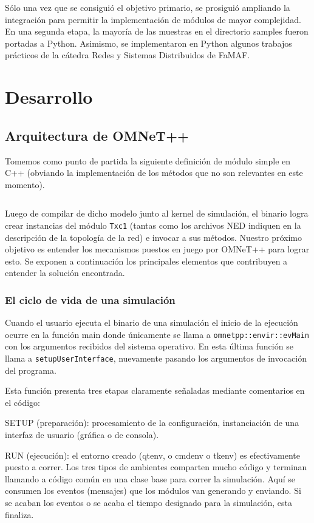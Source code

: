 \documentclass[]{article}
\begin{document}
Sólo una vez que se consiguió el objetivo primario, se prosiguió ampliando la
integración para permitir la implementación de módulos de mayor complejidad. En
una segunda etapa, la mayoría de las muestras en el directorio samples fueron
portadas a Python. Asimismo, se implementaron en Python algunos trabajos
prácticos de la cátedra Redes y Sistemas Distribuidos de FaMAF.

\section{Desarrollo}
\subsection{Arquitectura de OMNeT++}

Tomemos como punto de partida la siguiente definición de módulo simple en C++
(obviando la implementación de los métodos que no son relevantes en este
momento).

\inputminted{c++}{codelistings/txc1.cc}

Luego de compilar de dicho modelo junto al kernel de simulación, el binario
logra crear instancias del módulo \verb!Txc1! (tantas como los archivos NED
indiquen en la descripción de la topología de la red) e invocar a sus métodos.
Nuestro próximo objetivo es entender los mecanismos puestos en juego por
OMNeT++ para lograr esto. Se exponen a continuación los principales elementos
que contribuyen a entender la solución encontrada.

\subsubsection{El ciclo de vida de una simulación}

Cuando el usuario ejecuta el binario de una simulación el inicio de la
ejecución ocurre en la función main donde únicamente se llama a
\verb!omnetpp::envir::evMain! con los argumentos recibidos del sistema
operativo. En esta última función se llama a \verb!setupUserInterface!,
nuevamente pasando los argumentos de invocación del programa.

Esta función presenta tres etapas claramente señaladas mediante comentarios en
el código:

SETUP (preparación): procesamiento de la configuración, instanciación de una
interfaz de usuario (gráfica o de consola).

RUN (ejecución): el entorno creado (qtenv, o cmdenv o tkenv) es efectivamente
puesto a correr. Los tres tipos de ambientes comparten mucho código y terminan
llamando a código común en una clase base para correr la simulación. Aquí se
consumen los eventos (mensajes) que los módulos van generando y enviando. Si se
acaban los eventos o se acaba el tiempo designado para la simulación, esta
finaliza.
\end{document}
